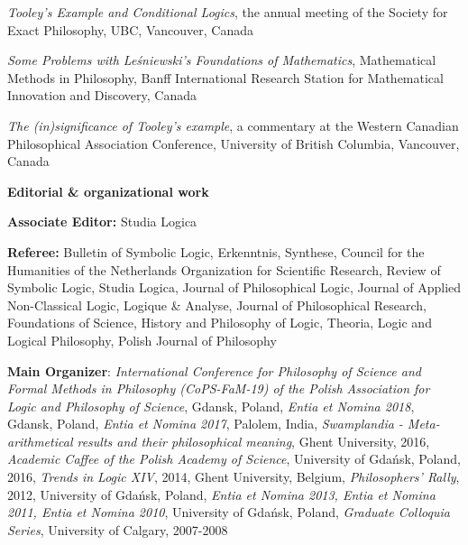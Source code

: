 \documentclass[10pt, a4paper]{article}
\newcommand{\years}[1]{\marginnote{\normalsize #1}}
\begin{document}
\vspace{0.5mm}


  \emph{Tooley's Example and Conditional Logics}, the annual meeting of the Society for Exact Philosophy,      UBC, Vancouver, Canada



\vspace{0.5mm}


 \emph{Some Problems with Le\'sniewski's Foundations of Mathematics},  Mathematical  Methods in Philosophy,  Banff
International Research Station for Mathematical Innovation and Discovery, Canada


\vspace{0.5mm}


\years{2006} \emph{The (in)significance of Tooley's example}, a commentary at the   Western Canadian Philosophical Association Conference,  University of British Columbia, Vancouver, Canada


\vspace{0.5mm}



\vspace{2mm}

\large {\sc \textbf{Editorial \& organizational work}}\normalsize \hspace{5mm}


\normalsize


\textbf{Associate Editor:} Studia Logica

\textbf{Referee:} Bulletin of Symbolic Logic, Erkenntnis,  Synthese, Council for the Humanities of the Netherlands Organization for Scientific Research, Review of Symbolic Logic,  Studia Logica,  Journal of Philosophical Logic, Journal of Applied Non-Classical Logic,  Logique \& Analyse,   Journal of Philosophical Research,  Foundations of Science,  History and Philosophy of Logic, Theoria, Logic and Logical Philosophy, Polish Journal of Philosophy



\textbf{Main Organizer}: \emph{International Conference for Philosophy of Science and Formal Methods in Philosophy (CoPS-FaM-19) of the Polish Association for Logic and Philosophy of Science}, Gdansk, Poland, \emph{Entia et Nomina 2018}, Gdansk, Poland,  \emph{Entia et Nomina 2017}, Palolem, India, \emph{Swamplandia - Meta-arithmetical results and their philosophical meaning}, Ghent University, 2016, \emph{Academic Caffee of the Polish Academy of Science}, University of Gda{\'n}sk, Poland, 2016, \emph{Trends in Logic XIV}, 2014, Ghent University, Belgium, \emph{Philosophers' Rally}, 2012, University of Gda\' nsk, Poland, \emph{Entia et Nomina 2013, Entia et Nomina 2011, Entia et Nomina 2010}, University of Gda{\'n}sk, Poland,  \emph{Graduate Colloquia Series}, University of Calgary, 2007-2008





%


%
\end{document}
